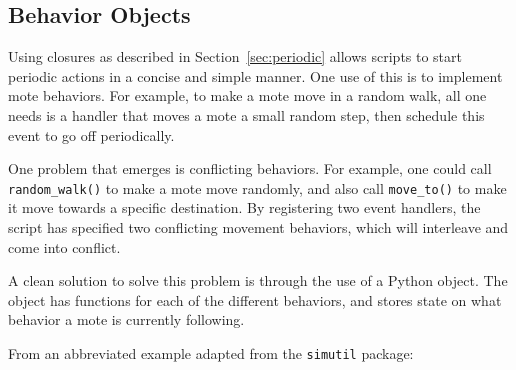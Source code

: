 \documentclass[10pt]{article}
\begin{document}
\subsection{Behavior Objects}

Using closures as described in Section~\ref{sec:periodic} allows
scripts to start periodic actions in a concise and simple manner. One
use of this is to implement mote behaviors. For example, to make a
mote move in a random walk, all one needs is a handler that moves a
mote a small random step, then schedule this event to go off
periodically.

One problem that emerges is conflicting behaviors. For example, one
could call {\tt random\_walk()} to make a mote move randomly, and also
call {\tt move\_to()} to make it move towards a specific destination.
By registering two event handlers, the script has specified two
conflicting movement behaviors, which will interleave and come into
conflict.

A clean solution to solve this problem is through the use of a Python
object. The object has functions for each of the different behaviors,
and stores state on what behavior a mote is currently following. 

From an abbreviated example adapted from the {\tt simutil} package:
\end{document}
